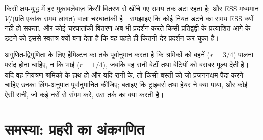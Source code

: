\begin{exercise}[$\star\star\star$]\label{exo:b3:behavioural-ecology:11}
किसी क्षय-युद्ध में हर मुक़ाबलेबाज़ किसी वितरण से खींचे गए समय तक डटा
रहता है; और ESS मध्यमान $V/$(प्रति एकांक समय लागत) वाला चरघातांकी है।
समझाइए कि कोई नियत डटने का समय ESS क्यों नहीं हो सकता, और कोई
चरघातांकी वितरण अब भी प्रदर्शन करते किसी प्रतिद्वंद्वी के प्रत्याशित
आगे के डटने को इससे स्वतंत्र क्यों बना देता है कि वह पहले ही कितनी देर
प्रदर्शन कर चुका है।
\end{exercise}

\begin{exercise}[$\star\star\star$]\label{exo:b3:behavioural-ecology:12}
अगुणित-द्विगुणिता के लिए हैमिल्टन का तर्क पूर्वानुमान करता है कि
श्रमिकों को बहनें ($r = 3/4$) पालना पसंद होना चाहिए, न कि भाई
($r = 1/4$), जबकि वह रानी बेटों तथा बेटियों को बराबर मूल्य देती है। यदि
वह नियंत्रण श्रमिकों के हाथ हो और यदि रानी के, तो किसी बस्ती को जो
प्रजननक्षम पैदा करने चाहिए उनका लिंग-अनुपात पूर्वानुमानित कीजिए; बताइए
कि ट्राइवर्स तथा हेयर ने क्या पाया, और कोई ऐसी रानी, जो कई नरों से संगम
करे, उस तर्क का क्या करती है।
\end{exercise}

\section{समस्या: प्रहरी का अंकगणित}

